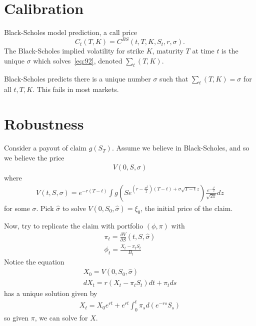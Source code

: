 \section{Calibration}
\label{sec:calibration}

Black-Scholes model prediction, a call price 
\begin{equation}
  \label{eq:92}
  C_{t}(T, K) = C^{BS}(t, T, K, S_{t}, r, \sigma).
\end{equation}
The Black-Scholes implied volatility for strike $K$, maturity $T$ at
time $t$ is the unique $\sigma$ which solves~\eqref{eq:92}, denoted
$\sum_{t}(T, K)$.

Black-Scholes predicts there is a unique number $\sigma$ such that
$\sum_{t}(T, K) = \sigma$ for all $t, T, K$.  This fails in most
markets.

\section{Robustness}
\label{sec:robustness}

Consider a payout of claim $g(S_{T})$.  Assume we believe in
Black-Scholes, and so we believe the price
\begin{align}
  \label{eq:93}
  V(0, S, \sigma)
\end{align} where
\begin{align}
  \label{eq:94}
  V(t, S, \sigma) = e^{-r(T-t)} \int
  g(Se^{(r-\frac{\sigma^{2}}{2})(T-t) + \sigma \sqrt{T-t}z})
  \frac{e^{-\frac{z^{2}}{2}}}{\sqrt{2 \pi}} dz
\end{align} for some $\sigma$.  Pick $\hat \sigma$ to solve $V(0,
S_{0}, \hat \sigma) = \xi_{0}$, the initial price of the claim.

Now, try to replicate the claim with portfolio $(\phi, \pi)$ with
\begin{align}
  \label{eq:95}
  \pi_{t} = \frac{\partial V}{\partial S}(t, S, \hat \sigma) \\
  \phi_{t} = \frac{X_{t} - \pi_{t} S_{t}}{B_{t}}
\end{align}  Notice the equation
\begin{align}
  \label{eq:96}
  X_{0} = V(0, S_{0}, \hat \sigma) \\
  dX_{t} = r(X_{t} - \pi_{t} S_{t}) dt + \pi_{t} ds
\end{align} has a unique solution given by
\begin{align}
  \label{eq:97}
  X_{t} = X_{0} e^{rt} + e^{rt} \int_{0}^{t} \pi_{s} d(e^{-rs} S_{s})
\end{align} so given $\pi$, we can solve for $X$.

